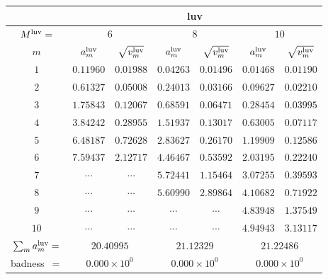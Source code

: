 \begin{tabular}{c|cc|cc|cc|}
&
\multicolumn{6}{|c|}{luv} \\
\hline
$M^{\mathrm{luv}}=$ &
 \multicolumn{2}{|c|}{$6$} &
 \multicolumn{2}{|c|}{$8$} &
 \multicolumn{2}{|c|}{$10$} \\
$m$ &
 $a^{\mathrm{luv}}_m$ & $\sqrt{v^{\mathrm{luv}}_m}$ &
 $a^{\mathrm{luv}}_m$ & $\sqrt{v^{\mathrm{luv}}_m}$ &
 $a^{\mathrm{luv}}_m$ & $\sqrt{v^{\mathrm{luv}}_m}$ \\
$1$ &
 $0.11960$ & $0.01988$ &
 $0.04263$ & $0.01496$ &
 $0.01468$ & $0.01190$ \\
$2$ &
 $0.61327$ & $0.05008$ &
 $0.24013$ & $0.03166$ &
 $0.09627$ & $0.02210$ \\
$3$ &
 $1.75843$ & $0.12067$ &
 $0.68591$ & $0.06471$ &
 $0.28454$ & $0.03995$ \\
$4$ &
 $3.84242$ & $0.28955$ &
 $1.51937$ & $0.13017$ &
 $0.63005$ & $0.07117$ \\
$5$ &
 $6.48187$ & $0.72628$ &
 $2.83627$ & $0.26170$ &
 $1.19909$ & $0.12586$ \\
$6$ &
 $7.59437$ & $2.12717$ &
 $4.46467$ & $0.53592$ &
 $2.03195$ & $0.22240$ \\
$7$ &
 $\cdots$ & $\cdots$ &
 $5.72441$ & $1.15464$ &
 $3.07255$ & $0.39593$ \\
$8$ &
 $\cdots$ & $\cdots$ &
 $5.60990$ & $2.89864$ &
 $4.10682$ & $0.71922$ \\
$9$ &
 $\cdots$ & $\cdots$ &
 $\cdots$ & $\cdots$ &
 $4.83948$ & $1.37549$ \\
$10$ &
 $\cdots$ & $\cdots$ &
 $\cdots$ & $\cdots$ &
 $4.94943$ & $3.13117$ \\
\hline
$\sum_m a^{\mathrm{luv}}_m=$ &
 \multicolumn{2}{|c|}{$20.40995$} &
 \multicolumn{2}{|c|}{$21.12329$} &
 \multicolumn{2}{|c|}{$21.22486$} \\
badness~$=$ &
 \multicolumn{2}{|c|}{$0.000\times 10^{0}$} &
 \multicolumn{2}{|c|}{$0.000\times 10^{0}$} &
 \multicolumn{2}{|c|}{$0.000\times 10^{0}$} \\
\end{tabular}
